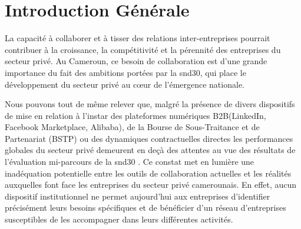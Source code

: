 \documentclass[12pt, a4paper, oneside]{report}
\begin{document}
	\medskip
	
	

\listoftables
{}


	\listoffigures
	

	
	
	\setcounter{page}{1}
	
	\chapter*{Introduction Générale}
	
La capacité à collaborer et à tisser des relations inter-entreprises pourrait contribuer à la croissance, la compétitivité et la pérennité des entreprises du secteur privé. Au Cameroun, ce besoin de collaboration est d'une grande importance du fait des ambitions portées par la \gls{snd30}, qui place le développement du secteur privé au cœur de l'émergence nationale\cite{minepat2020}.

 
Nous pouvons tout de m\^eme relever que, malgré la présence de divers dispositifs de mise en relation à l'instar des plateformes numériques B2B(LinkedIn, Facebook Marketplace, Alibaba), de la Bourse de Sous-Traitance et de Partenariat (BSTP) ou des dynamiques contractuelles directes les performances globales du secteur privé demeurent en deçà des attentes au vue des résultats de l'évaluation mi-parcours de la \gls{snd30} \cite{minepat2025}. Ce constat met en lumière une inadéquation potentielle entre les outils de collaboration actuelles et les réalités auxquelles font face les entreprises du secteur privé camerounais. En effet, aucun dispositif institutionnel ne permet aujourd'hui aux entreprises d'identifier précisément leurs besoins spécifiques et de bénéficier d'un réseau d'entreprises susceptibles de les accompagner dans leurs différentes activités. 
\end{document}
